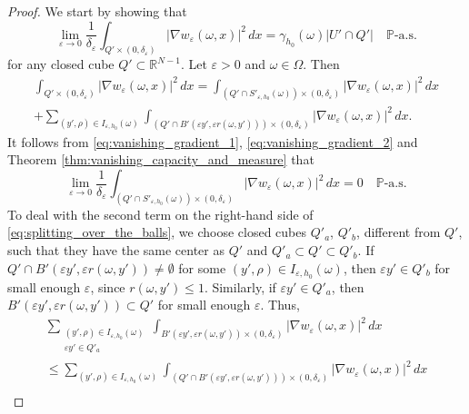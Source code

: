 \documentclass{article}
\numberwithin{equation}{section}
\theoremstyle{definition}
\theoremstyle{remark}
\begin{document}
\begin{proof}
    We start by showing that
    \begin{equation} \label{eq:discrete_approximation}
        \lim_{\varepsilon \to 0} \frac{1}{\delta_\varepsilon} \int_{Q' \times (0, \delta_\varepsilon)} |\nabla w_\varepsilon(\omega, x)|^2 \, dx = \gamma_{h_0}(\omega) |U' \cap Q'| \quad \mathbb{P}\text{-a.s.}
    \end{equation}
    for any closed cube $Q' \subset \mathbb{R}^{N - 1}$. Let $\varepsilon > 0$ and $\omega \in \Omega$. Then
    \begin{multline} \label{eq:splitting_over_the_balls}
        \int_{Q' \times (0, \delta_\varepsilon)} |\nabla w_\varepsilon(\omega, x)|^2 \, dx = \int_{(Q' \cap S'_{\varepsilon, h_0}(\omega)) \times (0, \delta_\varepsilon)} |\nabla w_\varepsilon(\omega, x)|^2 \, dx \\
        + \sum_{(y', \rho) \in I_{\varepsilon, h_0}(\omega)} \int_{(Q' \cap B'(\varepsilon y', \varepsilon r(\omega, y'))) \times (0, \delta_\varepsilon)} |\nabla w_\varepsilon(\omega, x)|^2 \, dx.
    \end{multline}
    It follows from \eqref{eq:vanishing_gradient_1}, \eqref{eq:vanishing_gradient_2} and Theorem \ref{thm:vanishing_capacity_and_measure} that
    \[
    \lim_{\varepsilon \to 0} \frac{1}{\delta_\varepsilon} \int_{(Q' \cap S'_{\varepsilon, h_0}(\omega)) \times (0, \delta_\varepsilon)} |\nabla w_\varepsilon(\omega, x)|^2 \, dx = 0 \quad \mathbb{P}\text{-a.s.}
    \]
    To deal with the second term on the right-hand side of \eqref{eq:splitting_over_the_balls}, we choose closed cubes $Q'_a$, $Q'_b$, different from $Q'$, such that they have the same center as $Q'$ and $Q'_a \subset Q' \subset Q'_b$. If $Q' \cap B'(\varepsilon y', \varepsilon r(\omega, y')) \neq \emptyset$ for some $(y', \rho) \in I_{\varepsilon, h_0}(\omega)$, then $\varepsilon y' \in Q'_b$ for small enough $\varepsilon$, since $r(\omega, y') \le 1$. Similarly, if $\varepsilon y' \in Q'_a$, then $B'(\varepsilon y', \varepsilon r(\omega, y')) \subset Q'$ for small enough $\varepsilon$. Thus,
    \begin{multline*}
        \sum \limits_{\substack{(y', \rho) \in I_{\varepsilon, h_0}(\omega) \\ \varepsilon y' \in Q'_a}} \int_{B'(\varepsilon y', \varepsilon r(\omega, y')) \times (0, \delta_\varepsilon)} |\nabla w_\varepsilon(\omega, x)|^2 \, dx \\
        \le \sum_{(y', \rho) \in I_{\varepsilon, h_0}(\omega)} \int_{(Q' \cap B'(\varepsilon y', \varepsilon r(\omega, y')))\times (0, \delta_\varepsilon)} |\nabla w_\varepsilon(\omega, x)|^2 \, dx \\

\end{multline*}
\end{proof}
\end{document}
